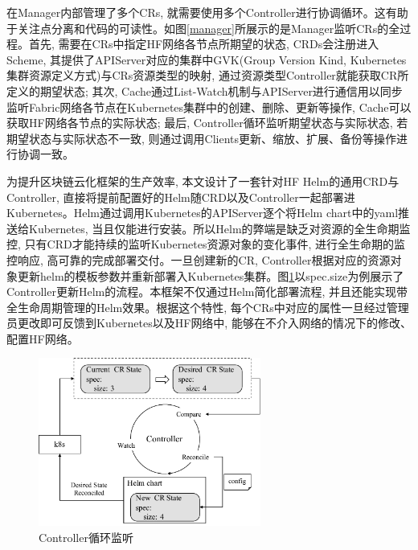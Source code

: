 在Manager内部管理了多个CRs, 就需要使用多个Controller进行协调循环。这有助于关注点分离和代码的可读性。如图\ref{manager}所展示的是Manager监听CRs的全过程。首先, 需要在CRs中指定HF网络各节点所期望的状态, CRDs会注册进入Scheme, 其提供了APIServer对应的集群中GVK(Group Version Kind, Kubernetes集群资源定义方式)与CRs资源类型的映射, 通过资源类型Controller就能获取CR所定义的期望状态; 其次, Cache通过List-Watch机制与APIServer进行通信用以同步监听Fabric网络各节点在Kubernetes集群中的创建、删除、更新等操作, Cache可以获取HF网络各节点的实际状态; 最后, Controller循环监听期望状态与实际状态, 若期望状态与实际状态不一致, 则通过调用Clients更新、缩放、扩展、备份等操作进行协调一致。

为提升区块链云化框架的生产效率, 本文设计了一套针对HF Helm的通用CRD与Controller, 直接将提前配置好的Helm随CRD以及Controller一起部署进Kubernetes。Helm通过调用Kubernetes的APIServer逐个将Helm chart中的yaml推送给Kubernetes, 当且仅能进行安装。所以Helm的弊端是缺乏对资源的全生命期监控, 只有CRD才能持续的监听Kubernetes资源对象的变化事件, 进行全生命期的监控响应, 高可靠的完成部署交付。一旦创建新的CR, Controller根据对应的资源对象更新helm的模板参数并重新部署入Kubernetes集群。图\ref{controller}以spec.size为例展示了Controller更新Helm的流程。本框架不仅通过Helm简化部署流程, 并且还能实现带全生命周期管理的Helm效果。根据这个特性, 每个CRs中对应的属性一旦经过管理员更改即可反馈到Kubernetes以及HF网络中, 能够在不介入网络的情况下的修改、配置HF网络。

\begin{figure}[h] %
    \centering %
    \includegraphics[width=0.65\textwidth]{FIGs/chapter4/controller.pdf} %
    \caption{Controller循环监听} %
    \label{controller} %
\end{figure}%

